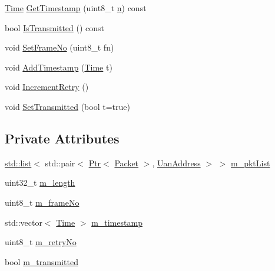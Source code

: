 \begin{DoxyCompactItemize}
\item 
\hyperlink{classns3_1_1Time}{Time} \hyperlink{classns3_1_1Reservation_af4e22c82ede55102160c463538b49ced}{Get\+Timestamp} (uint8\+\_\+t \hyperlink{lte__link__budget__x2__handover__measures_8m_abdb05bc5a064cf642a06c83b3392f148}{n}) const 
\item 
bool \hyperlink{classns3_1_1Reservation_a1ddedfae94c9862c7bdf45c5d088adc0}{Is\+Transmitted} () const 
\item 
void \hyperlink{classns3_1_1Reservation_aa51308eee2a07af608d08a893639481a}{Set\+Frame\+No} (uint8\+\_\+t fn)
\item 
void \hyperlink{classns3_1_1Reservation_ae1963e5222194d58e0670acecab9edb7}{Add\+Timestamp} (\hyperlink{classns3_1_1Time}{Time} t)
\item 
void \hyperlink{classns3_1_1Reservation_a813e78639aa1183ac155e7a43d5cc96c}{Increment\+Retry} ()
\item 
void \hyperlink{classns3_1_1Reservation_ab99b79ea731f0803a3c4d04742c93f97}{Set\+Transmitted} (bool t=true)
\end{DoxyCompactItemize}
\subsection*{Private Attributes}
\begin{DoxyCompactItemize}
\item 
\hyperlink{openflow-interface_8h_afd9bcfa176617760671b67580f536fa7}{std\+::list}$<$ std\+::pair$<$ \hyperlink{classns3_1_1Ptr}{Ptr}$<$ \hyperlink{classns3_1_1Packet}{Packet} $>$, \hyperlink{classns3_1_1UanAddress}{Uan\+Address} $>$ $>$ \hyperlink{classns3_1_1Reservation_a8fa52e513a05f8afa950af135d0cd2be}{m\+\_\+pkt\+List}
\item 
uint32\+\_\+t \hyperlink{classns3_1_1Reservation_aaf518d264c53d097ad13482d3d28e705}{m\+\_\+length}
\item 
uint8\+\_\+t \hyperlink{classns3_1_1Reservation_aa346acbdd7322ad8897716f7b9a1e52c}{m\+\_\+frame\+No}
\item 
std\+::vector$<$ \hyperlink{classns3_1_1Time}{Time} $>$ \hyperlink{classns3_1_1Reservation_afcbc679288aaaa33c6718fea6303aae6}{m\+\_\+timestamp}
\item 
uint8\+\_\+t \hyperlink{classns3_1_1Reservation_aaa54368daa4187d371d5423031fb2837}{m\+\_\+retry\+No}
\item 
bool \hyperlink{classns3_1_1Reservation_a38ee2269226398d71147fc893cc39c96}{m\+\_\+transmitted}
\end{DoxyCompactItemize}


